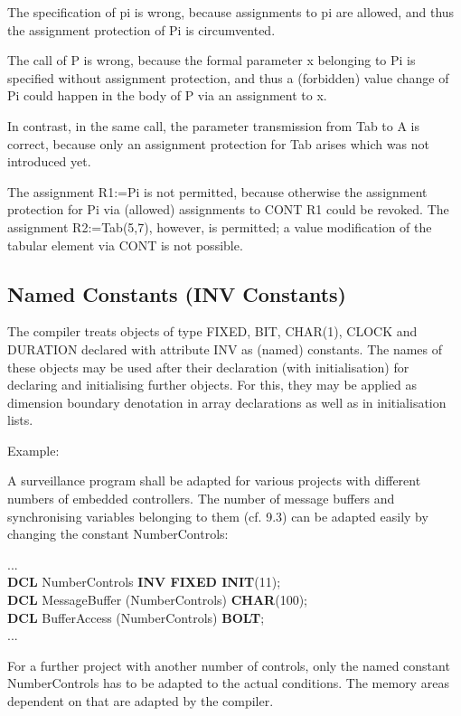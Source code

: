 \begin{tobedone}
The specification of pi is wrong, because assignments to pi are allowed,
and thus the assignment protection of Pi is circumvented.

The call of P is wrong, because the formal parameter x belonging to Pi
is specified without assignment protection, and thus a (forbidden) value
change of Pi could happen in the body of P via an assignment to x.

In contrast, in the same call, the parameter transmission from Tab to A
is correct, because only an assignment protection for Tab arises which
was not introduced yet.

The assignment R1:=Pi is not permitted, because otherwise the assignment
protection for Pi via (allowed) assignments to CONT R1 could be revoked.
The assignment R2:=Tab(5,7), however, is permitted; a value modification
of the tabular element via CONT is not possible.

\subsection{Named Constants (INV Constants)}   %

The compiler treats objects of type FIXED, BIT, CHAR(1), CLOCK and
DURATION declared with attribute INV as (named) constants. The names of
these objects may be used after their declaration (with initialisation)
for declaring and initialising further objects. For this, they may be
applied as dimension boundary denotation in array declarations as well
as in initialisation lists.

Example:

A surveillance program shall be adapted for various projects with
different numbers of embedded controllers. The number of message
buffers and synchronising variables belonging to them (cf. 9.3) can be
adapted easily by changing the constant NumberControls:

...\\
{\bf DCL} NumberControls {\bf INV FIXED INIT}(11);\\

{\bf DCL} MessageBuffer (NumberControls) {\bf CHAR}(100); \\
{\bf DCL} BufferAccess (NumberControls) {\bf BOLT};\\
...

For a further project with another number of controls, only the named
constant NumberControls has to be adapted to the actual conditions. The
memory areas dependent on that are adapted by the compiler.


\end{tobedone}
